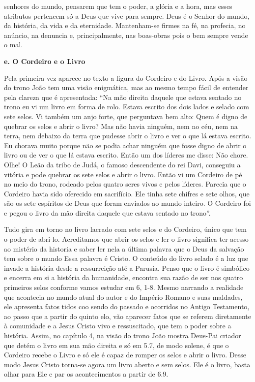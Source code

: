\documentclass[
]{book}
\begin{document}
senhores do mundo, pensarem que tem o poder, a glória e a hora, mas esses atributos pertencem só a Deus que vive para sempre. Deus é o Senhor do mundo, da história, da vida e da eternidade. Mantenham-se firmes na fé, na profecia, no anúncio, na denuncia e, principalmente, nas boas-obras pois o bem sempre vende o mal.

\textbf{e. O Cordeiro e o Livro}

Pela primeira vez aparece no texto a figura do Cordeiro e do Livro. Após a visão do trono João tem uma visão enigmática, mas ao mesmo tempo fácil de entender pela clareza que é apresentada: ``Na mão direita daquele que estava sentado no trono eu vi um livro em forma de rolo. Estava escrito dos dois lados e selado com sete selos. Vi também um anjo forte, que perguntava bem alto: Quem é digno de quebrar os selos e abrir o livro? Mas não havia ninguém, nem no céu, nem na terra, nem debaixo da terra que pudesse abrir o livro e ver o que lá estava escrito. Eu chorava muito porque não se podia achar ninguém que fosse digno de abrir o livro ou de ver o que lá estava escrito. Então um dos líderes me disse: Não chore. Olhe! O Leão da tribo de Judá, o famoso descendente do rei Davi, conseguiu a vitória e pode quebrar os sete selos e abrir o livro. Então vi um Cordeiro de pé no meio do trono, rodeado pelos quatro seres vivos e pelos líderes. Parecia que o Cordeiro havia sido oferecido em sacrifício. Ele tinha sete chifres e sete olhos, que são os sete espíritos de Deus que foram enviados ao mundo inteiro. O Cordeiro foi e pegou o livro da mão direita daquele que estava sentado no trono''.

Tudo gira em torno no livro lacrado com sete selos e do Cordeiro, único que tem o poder de abri-lo. Acreditamos que abrir os selos e ler o livro significa ter acesso ao mistério da historia e saber ler nela a última palavra que o Deus da salvação tem sobre o mundo Essa palavra é Cristo. O conteúdo do livro selado é a luz que invade a história desde a ressurreição até a Parusia. Penso que o livro é simbólico e encerra em si a história da humanidade, encontra sua razão de ser nos quatro primeiros selos conforme vamos estudar em 6, 1-8. Mesmo narrando a realidade que acontecia no mundo atual do autor e do Império Romano e suas maldades, ele apresenta fatos tidos coo sendo do passado e ocorridos no Antigo Testamento, ao passo que a partir do quinto elo, vão aparecer fatos que se referem diretamente à comunidade e a Jesus Cristo vivo e ressuscitado, que tem o poder sobre a história. Assim, no capítulo 4, na visão do trono João mostra Deus-Pai criador que detém o livro em sua mão direita e só em 5.7, de modo solene, é que o Cordeiro recebe o Livro e só ele é capaz de romper os selos e abrir o livro. Desse modo Jesus Cristo torna-se agora um livro aberto e sem selos. Ele é o livro, basta olhar para Ele e par os acontecimentos a partir de 6.9.
\end{document}
